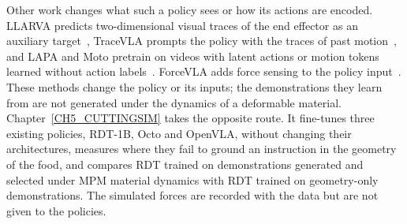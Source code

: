     Other work changes what such a policy sees or how its actions are encoded. LLARVA predicts two-dimensional visual traces of the end effector as an auxiliary target~\citep{llarva}, TraceVLA prompts the policy with the traces of past motion~\citep{tracevla}, and LAPA and Moto pretrain on videos with latent actions or motion tokens learned without action labels~\citep{lapa,moto}. ForceVLA adds force sensing to the policy input~\citep{yu2025forcevla}. These methods change the policy or its inputs; the demonstrations they learn from are not generated under the dynamics of a deformable material. Chapter~\ref{CH5_CUTTINGSIM} takes the opposite route. It fine-tunes three existing policies, RDT-1B, Octo and OpenVLA, without changing their architectures, measures where they fail to ground an instruction in the geometry of the food, and compares RDT trained on demonstrations generated and selected under MPM material dynamics with RDT trained on geometry-only demonstrations. The simulated forces are recorded with the data but are not given to the policies.

